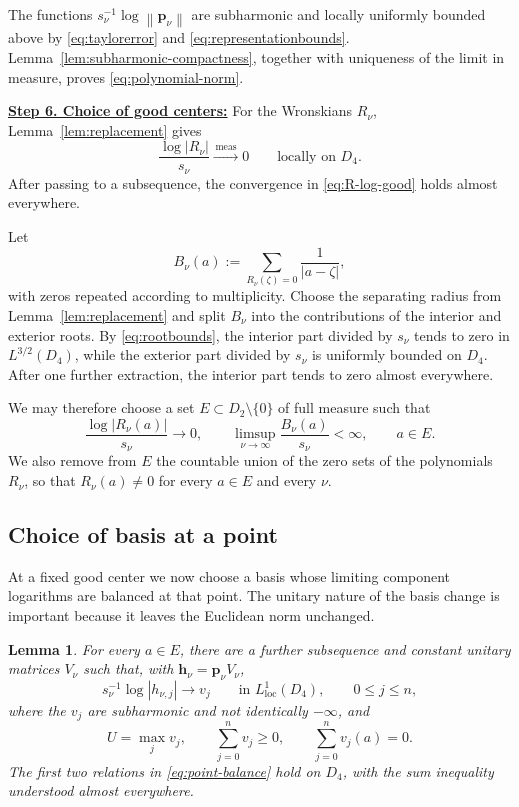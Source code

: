 \documentclass[12pt,letterpaper,reqno]{amsart}
\newtheorem{lem}[thm]{Lemma}
\theoremstyle{definition}
\numberwithin{equation}{section}
\newcommand{\loc}{\mathrm{loc}}
\newcommand{\norm}[1]{\left\lVert#1\right\rVert}
\newcommand{\convmeas}{\xrightarrow{\,\mathrm{meas}\,}}
\newcommand{\pv}{\bm p}
\newcommand{\hv}{\bm h}
\begin{document}
The functions \(s_\nu^{-1}\log\norm{\pv_\nu}\) are subharmonic and
locally uniformly bounded above by \eqref{eq:taylorerror} and
\eqref{eq:representationbounds}. Lemma~\ref{lem:subharmonic-compactness},
together with uniqueness of the limit in measure, proves
\eqref{eq:polynomial-norm}.


\medskip\noindent
\textbf{\underline{Step 6. Choice of good centers:}}
For the Wronskians \(R_\nu\), Lemma~\ref{lem:replacement} gives
\begin{equation}\label{eq:R-log-good}
 \frac{\log|R_\nu|}{s_\nu}
 \convmeas0
 \qquad\text{locally on }D_4.
\end{equation}
After passing to a subsequence, the convergence in
\eqref{eq:R-log-good} holds almost everywhere.

Let
\[
B_\nu(a)
:=
\sum_{R_\nu(\zeta)=0}\frac1{|a-\zeta|},
\]
with zeros repeated according to multiplicity.
Choose the separating radius from Lemma~\ref{lem:replacement} and split
\(B_\nu\) into the contributions of the interior and exterior
roots. By \eqref{eq:rootbounds}, the
interior part divided by \(s_\nu\) tends to zero in
\(L^{3/2}(D_4)\), while the exterior part divided by \(s_\nu\) is
uniformly bounded on \(D_4\). After one further extraction, the
interior part tends to zero almost everywhere.

We may therefore choose a set
\(E\subset D_2\setminus\{0\}\) of full measure such that
\begin{equation}\label{eq:good-centers}
 \frac{\log|R_\nu(a)|}{s_\nu}\longrightarrow0,
 \qquad
 \limsup_{\nu\to\infty}
 \frac{B_\nu(a)}{s_\nu}<\infty,
 \qquad
 a\in E.
\end{equation}
We also remove from \(E\) the countable union of the zero sets of the
polynomials \(R_\nu\), so that \(R_\nu(a)\ne0\) for every
\(a\in E\) and every \(\nu\).


\subsection{Choice of basis at a point}

At a fixed good center we now choose a basis whose limiting component
logarithms are balanced at that point. The unitary nature of the basis
change is important because it leaves the Euclidean norm unchanged.

\begin{lem}\label{lem:basis-at-point}
For every \(a\in E\), there are a further subsequence and constant
unitary matrices \(V_\nu\) such that, with
\(\hv_\nu=\pv_\nu V_\nu\),
\[
s_\nu^{-1}\log|h_{\nu,j}|
\longrightarrow v_j
\qquad\text{in }L^1_{\loc}(D_4),
\qquad
0\leq j\leq n,
\]
where the \(v_j\) are subharmonic and not identically \(-\infty\), and
\begin{equation}\label{eq:point-balance}
 U=\max_jv_j,
 \qquad
 \sum_{j=0}^{n}v_j\geq0,
 \qquad
 \sum_{j=0}^{n}v_j(a)=0.
\end{equation}
The first two relations in \eqref{eq:point-balance} hold on \(D_4\),
with the sum inequality understood almost everywhere.
\end{lem}
\end{document}
